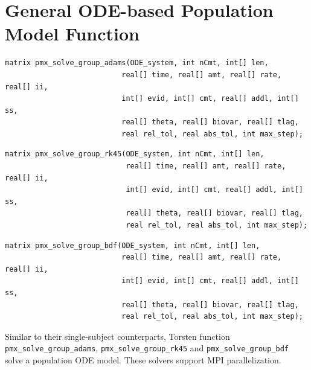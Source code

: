 \documentclass[11pt, reqno, oneside]{amsbook}
\numberwithin{equation}{chapter}
\numberwithin{figure}{chapter}
\numberwithin{table}{chapter}
\theoremstyle{remark}
\begin{document}
\section{General ODE-based Population Model Function}
\label{sec:org1985a51}
\begin{verbatim}
matrix pmx_solve_group_adams(ODE_system, int nCmt, int[] len,
                           real[] time, real[] amt, real[] rate, real[] ii,
                           int[] evid, int[] cmt, real[] addl, int[] ss,
                           real[] theta, real[] biovar, real[] tlag,                      
                           real rel_tol, real abs_tol, int max_step);
\end{verbatim}
\begin{verbatim}
matrix pmx_solve_group_rk45(ODE_system, int nCmt, int[] len,
                            real[] time, real[] amt, real[] rate, real[] ii,
                            int[] evid, int[] cmt, real[] addl, int[] ss,
                            real[] theta, real[] biovar, real[] tlag,                      
                            real rel_tol, real abs_tol, int max_step);
\end{verbatim}
\begin{verbatim}
matrix pmx_solve_group_bdf(ODE_system, int nCmt, int[] len,
                           real[] time, real[] amt, real[] rate, real[] ii,
                           int[] evid, int[] cmt, real[] addl, int[] ss,
                           real[] theta, real[] biovar, real[] tlag,                      
                           real rel_tol, real abs_tol, int max_step);
\end{verbatim}
Similar to their single-subject counterparts, Torsten function \texttt{pmx\_solve\_group\_adams}, \texttt{pmx\_solve\_group\_rk45} and
\texttt{pmx\_solve\_group\_bdf} solve a population ODE model. These
solvers support MPI parallelization.
\end{document}
